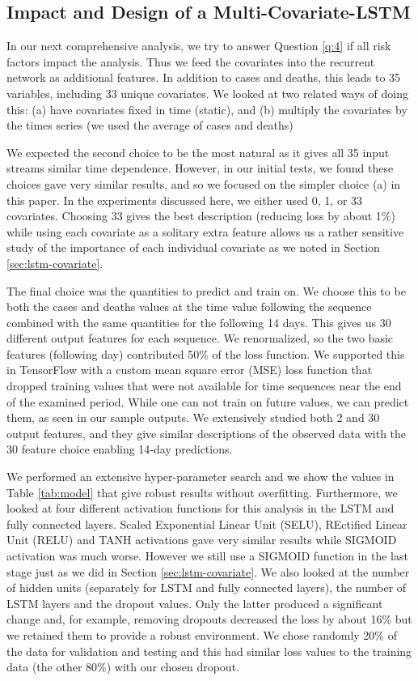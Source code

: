 \documentclass[letterpaper, inpress]{jds} %
\renewcommand{\_}{%
    \textunderscore\hspace{0pt}%
}
\begin{document}
\subsection{Impact and Design of a Multi-Covariate-LSTM}
\label{sec:lstm-many}

In our next comprehensive analysis, we try to answer Question
\ref{q:4} if all risk factors impact the analysis. Thus we feed the
covariates into the recurrent network as additional features. In
addition to cases and deaths, this leads to 35 variables, including 33
unique covariates. We looked at two related ways of doing this: (a)
have covariates fixed in time (static), and (b) multiply the
covariates by the times series (we used the average of cases and
deaths)

We expected the second choice to be the most natural as it gives all
35 input streams similar time dependence. However, in our initial
tests, we found these choices gave very similar results, and so we
focused on the simpler choice (a) in this paper. In the experiments
discussed here, we either used 0, 1, or 33 covariates. Choosing 33
gives the best description (reducing loss by about 1\%) while using
each covariate as a solitary extra feature allows us a rather
sensitive study of the importance of each individual covariate as we
noted in Section \ref{sec:lstm-covariate}.

The final choice was the quantities to predict and train on. We choose
this to be both the cases and deaths values at the time value
following the sequence combined with the same quantities for the
following 14 days. This gives us 30 different output features for each
sequence. We renormalized, so the two basic features (following day)
contributed 50\% of the loss function. We supported this in TensorFlow
with a custom mean square error (MSE) loss function that dropped
training values that were not available for time sequences near the
end of the examined period. While one can not train on future values,
we can predict them, as seen in our sample outputs. We extensively
studied both 2 and 30 output features, and they give similar
descriptions of the observed data with the 30 feature choice enabling
14-day predictions.

We performed an extensive hyper-parameter search and we show the
values in Table \ref{tab:model} that give robust results without
overfitting. Furthermore, we looked at four different activation
functions for this analysis in the LSTM and fully connected
layers. Scaled Exponential Linear Unit (SELU), REctified Linear Unit
(RELU) and TANH activations gave very similar results while SIGMOID
activation was much worse. However we still use a SIGMOID function in
the last stage just as we did in Section \ref{sec:lstm-covariate}. We
also looked at the number of hidden units (separately for LSTM and
fully connected layers), the number of LSTM layers and the dropout
values.  Only the latter produced a significant change and, for
example, removing dropouts decreased the loss by about 16\% but we
retained them to provide a robust environment. We chose randomly 20\%
of the data for validation and testing and this had similar loss
values to the training data (the other 80\%) with our chosen dropout.
\end{document}
